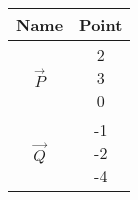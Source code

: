 \begin{tabular}[12pt]{ |c| c|}
    \hline
    \textbf{Name} & \textbf{Point}\\ 
    \hline
	$\Vec{P}$ & \myvec{2\\3\\0} \\
    \hline 
    $\Vec{Q}$ & \myvec{-1\\-2\\-4} \\
    \hline
    \end{tabular}\\